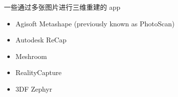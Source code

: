 
\begin{issues}
\issueDraft
\end{issues}

一些通过多张图片进行三维重建的 app
\begin{itemize}
\item Agisoft Metashape (previously known as PhotoScan)
\item Autodesk ReCap
\item Meshroom
\item RealityCapture
\item 3DF Zephyr
\end{itemize}
